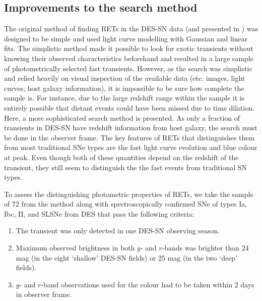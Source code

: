 \documentclass[fleqn,usenatbib,]{mnras}
\begin{document}
\subsection{Improvements to the search method}

The original method of finding RETs in the DES-SN data (and presented in ) was designed to be simple and used light curve modelling with Gaussian and linear fits. The simplistic method made it possible to look for exotic transients without knowing their observed characteristics beforehand and resulted in a large sample of photometrically selected fast transients. However, as the search was simplistic and relied heavily on visual inspection of the available data (etc. images, light curves, host galaxy information), it is impossible to be sure how complete the sample is. For instance, due to the large redshift range within the sample it is entirely possible that distant events could have been missed due to time dilation. Here, a more sophisticated search method is presented. As only a fraction of transients in DES-SN have redshift information from host galaxy, the search must be done in the observer frame.  The key features of RETs that distinguishes them from most traditional SNe types are the fast light curve evolution and blue colour at peak. Even though both of these quantities depend on the redshift of the transient, they still seem to distinguish the the fast events from traditional SN types. 

To assess the distinguishing photometric properties of RETs, we take the sample of 72 from the  method along with spectroscopically confirmed SNe of types Ia, Ibc, II, and SLSNe from DES that pass the following criteria:
\begin{enumerate}
\item The transient was only detected in one DES-SN observing season.
\item Maximum observed brightness in both $g$- and $r$-bands was brighter than 24 mag (in the eight `shallow' DES-SN fields) or 25 mag (in the two `deep' fields).
\item $g$- and $r$-band observations used for the colour had to be taken within 2 days in observer frame.
\end{enumerate}
\end{document}

